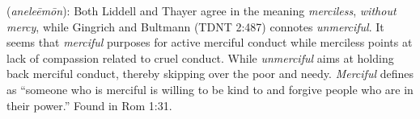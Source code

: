 \item[Unmerciful,]

(\textit{aneleēmōn}):
Both Liddell and Thayer agree in the meaning \emph{merciless}, \emph{without mercy}, while Gingrich and Bultmann (TDNT 2:487) connotes \emph{unmerciful}. It seems that \emph{merciful} purposes for active merciful conduct while merciless points at lack of compassion related to cruel conduct. While \emph{unmerciful} aims at holding back merciful conduct, thereby skipping over the poor and needy. \emph{Merciful} defines as ``someone who is merciful is willing to be kind to and forgive people who are in their power.''
Found in Rom 1:31.
